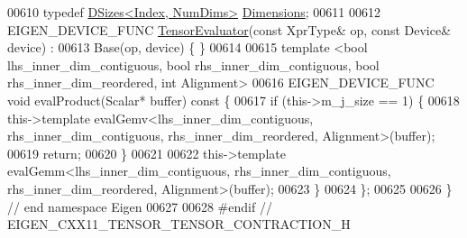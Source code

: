 \begin{DoxyCode}
00610   \textcolor{keyword}{typedef} \hyperlink{struct_eigen_1_1_d_sizes}{DSizes<Index, NumDims>} \hyperlink{struct_eigen_1_1_d_sizes}{Dimensions};
00611 
00612   EIGEN\_DEVICE\_FUNC \hyperlink{struct_eigen_1_1_tensor_evaluator}{TensorEvaluator}(\textcolor{keyword}{const} XprType& op, \textcolor{keyword}{const} Device& device) :
00613       Base(op, device) \{ \}
00614 
00615   \textcolor{keyword}{template} <\textcolor{keywordtype}{bool} lhs\_inner\_dim\_contiguous, \textcolor{keywordtype}{bool} rhs\_inner\_dim\_contiguous, \textcolor{keywordtype}{bool} rhs\_inner\_dim\_reordered, \textcolor{keywordtype}{int}
       Alignment>
00616   EIGEN\_DEVICE\_FUNC \textcolor{keywordtype}{void} evalProduct(Scalar* buffer)\textcolor{keyword}{ const }\{
00617     \textcolor{keywordflow}{if} (this->m\_j\_size == 1) \{
00618       this->\textcolor{keyword}{template} evalGemv<lhs\_inner\_dim\_contiguous, rhs\_inner\_dim\_contiguous, rhs\_inner\_dim\_reordered,
       Alignment>(buffer);
00619       \textcolor{keywordflow}{return};
00620     \}
00621 
00622     this->\textcolor{keyword}{template} evalGemm<lhs\_inner\_dim\_contiguous, rhs\_inner\_dim\_contiguous, rhs\_inner\_dim\_reordered,
       Alignment>(buffer);
00623   \}
00624 \};
00625 
00626 \} \textcolor{comment}{// end namespace Eigen}
00627 
00628 \textcolor{preprocessor}{#endif // EIGEN\_CXX11\_TENSOR\_TENSOR\_CONTRACTION\_H}
\end{DoxyCode}
